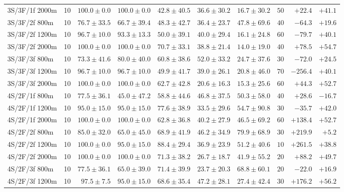 \begin{tabular}{l r r r r r r r r r}
3S/3F/1f 2000m & 10 & $100.0 \pm 0.0$ & $100.0 \pm 0.0$ & $42.8 \pm 40.5$ & $36.6 \pm 30.2$ & $16.7 \pm 30.2$ & $50$ & $+22.4$ & $+41.1$ \\
3S/3F/2f 800m & 10 & $76.7 \pm 33.5$ & $66.7 \pm 39.4$ & $48.3 \pm 42.7$ & $36.4 \pm 23.7$ & $47.8 \pm 69.6$ & $40$ & $-64.3$ & $+19.6$ \\
3S/3F/2f 1200m & 10 & $96.7 \pm 10.0$ & $93.3 \pm 13.3$ & $50.0 \pm 39.1$ & $40.0 \pm 29.4$ & $16.1 \pm 24.8$ & $60$ & $-79.7$ & $+40.1$ \\
3S/3F/2f 2000m & 10 & $100.0 \pm 0.0$ & $100.0 \pm 0.0$ & $70.7 \pm 33.1$ & $38.8 \pm 21.4$ & $14.0 \pm 19.0$ & $40$ & $+78.5$ & $+54.7$ \\
3S/3F/3f 800m & 10 & $73.3 \pm 41.6$ & $80.0 \pm 40.0$ & $60.8 \pm 38.6$ & $52.0 \pm 33.2$ & $24.7 \pm 37.6$ & $30$ & $-72.0$ & $+24.5$ \\
3S/3F/3f 1200m & 10 & $96.7 \pm 10.0$ & $96.7 \pm 10.0$ & $49.9 \pm 41.7$ & $39.0 \pm 26.1$ & $20.8 \pm 46.0$ & $70$ & $-256.4$ & $+40.1$ \\
3S/3F/3f 2000m & 10 & $100.0 \pm 0.0$ & $100.0 \pm 0.0$ & $62.7 \pm 42.8$ & $20.6 \pm 16.3$ & $15.3 \pm 25.6$ & $60$ & $+44.3$ & $+52.7$ \\
4S/2F/1f 800m & 10 & $77.5 \pm 36.1$ & $45.0 \pm 47.2$ & $58.8 \pm 44.6$ & $46.8 \pm 37.5$ & $50.3 \pm 58.0$ & $40$ & $+28.6$ & $-16.7$ \\
4S/2F/1f 1200m & 10 & $95.0 \pm 15.0$ & $95.0 \pm 15.0$ & $77.6 \pm 38.9$ & $33.5 \pm 29.6$ & $54.7 \pm 90.8$ & $30$ & $-35.7$ & $+42.0$ \\
4S/2F/1f 2000m & 10 & $100.0 \pm 0.0$ & $100.0 \pm 0.0$ & $62.8 \pm 36.8$ & $40.2 \pm 27.9$ & $46.5 \pm 69.2$ & $60$ & $+138.4$ & $+52.7$ \\
4S/2F/2f 800m & 10 & $85.0 \pm 32.0$ & $65.0 \pm 45.0$ & $68.9 \pm 41.9$ & $46.2 \pm 34.9$ & $79.9 \pm 68.9$ & $30$ & $+219.9$ & $+5.2$ \\
4S/2F/2f 1200m & 10 & $100.0 \pm 0.0$ & $95.0 \pm 15.0$ & $88.4 \pm 29.4$ & $36.9 \pm 23.9$ & $51.2 \pm 40.6$ & $10$ & $+261.5$ & $+38.8$ \\
4S/2F/2f 2000m & 10 & $100.0 \pm 0.0$ & $100.0 \pm 0.0$ & $71.3 \pm 38.2$ & $26.7 \pm 18.7$ & $41.9 \pm 55.2$ & $20$ & $+88.2$ & $+49.7$ \\
4S/2F/3f 800m & 10 & $77.5 \pm 36.1$ & $65.0 \pm 39.0$ & $71.4 \pm 39.9$ & $23.7 \pm 20.3$ & $68.8 \pm 60.1$ & $20$ & $-22.0$ & $+16.9$ \\
4S/2F/3f 1200m & 10 & $97.5 \pm 7.5$ & $95.0 \pm 15.0$ & $68.6 \pm 35.4$ & $47.2 \pm 28.1$ & $27.4 \pm 42.4$ & $30$ & $+176.2$ & $+56.2$ \\

\end{tabular}
